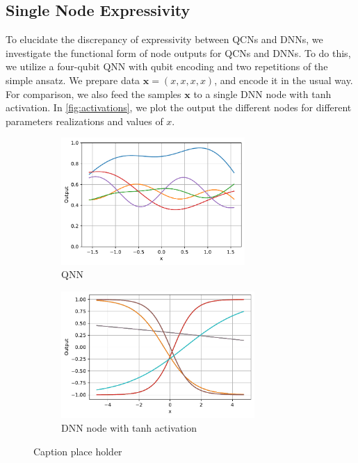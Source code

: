 \subsection{Single Node Expressivity}\label{sec:Single Node Expressivity}
To elucidate the discrepancy of expressivity between QCNs and DNNs, we investigate the functional form of node outputs for QCNs and DNNs. To do this, we utilize a four-qubit QNN with qubit encoding and two repetitions of the simple ansatz. We prepare data $\boldsymbol{x} = (x, x, x, x)$, and encode it in the usual way. For comparison, we also feed the samples $\boldsymbol{x}$ to a single DNN node with tanh activation. In \autoref{fig:activations}, we plot the output the different nodes for different parameters realizations and values of $x$.

\begin{figure}[H]
    \centering
    \begin{subfigure}[t]{0.5\textwidth}
        \centering
        \includegraphics[height=1.9in]{latex/figures/activation_qnn_4.pdf}
        \caption{QNN}
        \label{fig:activations tensorial}
    \end{subfigure}%
    \hfill 
    \begin{subfigure}[t]{0.5\textwidth}
        \centering
        \includegraphics[height=1.9in]{latex/figures/activation_dnn.pdf}
        \caption{DNN node with tanh activation}
        \label{fig:activations DNN}
    \end{subfigure}%
    \caption{Caption place holder}
    \label{fig:activations}
\end{figure}

